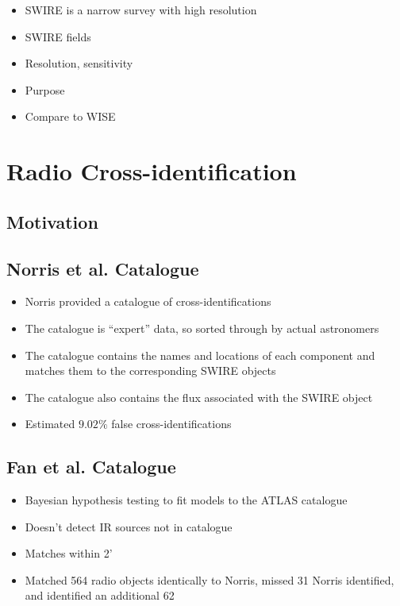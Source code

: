             \begin{itemize}
                \item SWIRE is a narrow survey with high resolution
                \item SWIRE fields
                \item Resolution, sensitivity
                \item Purpose
                \item Compare to WISE
            \end{itemize}

    \section{Radio Cross-identification}
    \label{sec:radio-cross-identification}

        \subsection{Motivation}
        \label{sec:cross-identification-motivation}

        \subsection{Norris et al. Catalogue}
        \label{sec:norris}

            \begin{itemize}
                \item Norris provided a catalogue of cross-identifications
                \item The catalogue is ``expert'' data, so sorted through by actual astronomers
                \item The catalogue contains the names and locations of each component and matches them to the corresponding SWIRE objects
                \item The catalogue also contains the flux associated with the SWIRE object
                \item Estimated $9.02\%$ false cross-identifications
            \end{itemize}

        \subsection{Fan et al. Catalogue}
        \label{sec:fan}

            \begin{itemize}
                \item Bayesian hypothesis testing to fit models to the ATLAS catalogue
                \item Doesn't detect IR sources not in catalogue
                \item Matches within 2'
                \item Matched 564 radio objects identically to Norris, missed 31 Norris identified, and identified an additional 62
            \end{itemize}

